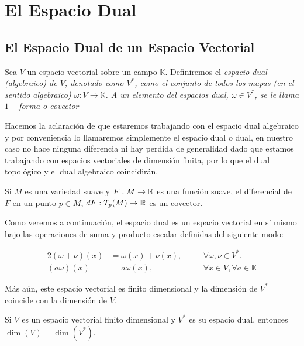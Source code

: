 \section{El Espacio Dual}\label{Sección: Espacio Dual}
\subsection{El Espacio Dual de un Espacio Vectorial}

\begin{definition}
  Sea $V$ un espacio vectorial sobre un campo $\mathbb{K}$. Definiremos el \it{espacio dual (algebraico) de $V$}, denotado como $V^*$, como el conjunto de todos los mapas (en el sentido algebraico) $\omega: V \to \mathbb{K}$. A un elemento del espacios dual, $\omega \in V^*$, se le llama \it{$1-$forma} o \it{covector}
\end{definition}

Hacemos la aclaración de que estaremos trabajando con el espacio dual algebraico y por conveniencia lo llamaremos simplemente el espacio dual o dual, en nuestro caso no hace ninguna diferencia ni hay perdida de generalidad dado que estamos trabajando con espacios vectoriales de dimensión finita, por lo que el dual topológico y el dual algebraico coincidirán.

\begin{example}
  Si $M$ es una variedad suave y $F: M \to \mathbb{R}$ es una función suave, el diferencial de $F$ en un punto $p \in M$, $dF: T_p(M) \to \mathbb{R}$ es un covector.
\end{example}

Como veremos a continuación, el espacio dual es un espacio vectorial en sí mismo bajo las operaciones de suma y producto escalar definidas del siguiente modo:

\begin{alignat*}{2}
  (\omega+\nu)(x)&=\omega(x)+\nu(x), \quad &&\forall \omega,\nu \in V^{*}. \\
  (a\omega)(x) &= a\omega(x), \quad &&\forall x\in V,\forall a \in\mathbb{K}
\end{alignat*}

Más aún, este espacio vectorial es finito dimensional y la dimensión de $V^{*}$ coincide con la dimensión de $V$.

\begin{theorem}
  Si $V$ es un espacio vectorial finito dimensional y $V^{*}$ es su espacio dual, entonces $\dim(V) = \dim(V^{*})$.
\end{theorem}

